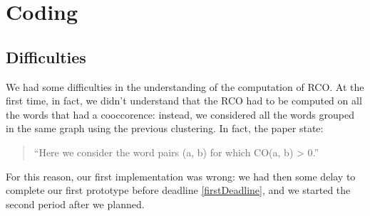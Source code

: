 \section{Coding}
    \subsection{Difficulties}
        We had some difficulties in the understanding of the computation of RCO. At the first time, in fact, we didn't understand that the RCO had to be computed on all the words that had a cooccorence: instead, we considered all the words grouped in the same graph using the previous clustering. In fact, the paper state:
        \begin{quotation}
            ``Here we consider the word pairs (a, b) for which CO(a, b) > 0.''
        \end{quotation}
        For this reason, our first implementation was wrong: we had then some delay to complete our first prototype before deadline \ref{firstDeadline}, and we started the second period after we planned.